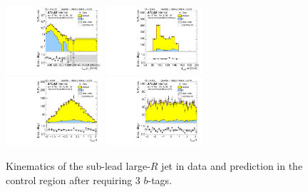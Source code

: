 \begin{figure}[htbp!]
\begin{center}
\includegraphics[width=0.32\textwidth,angle=-90]{figures/boosted/Control/b77_ThreeTag_Control_sublHCand_Pt_m_1.pdf}
\includegraphics[width=0.32\textwidth,angle=-90]{figures/boosted/Control/b77_ThreeTag_Control_sublHCand_Mass_s.pdf}\\
\includegraphics[width=0.32\textwidth,angle=-90]{figures/boosted/Control/b77_ThreeTag_Control_sublHCand_Eta.pdf}
\includegraphics[width=0.32\textwidth,angle=-90]{figures/boosted/Control/b77_ThreeTag_Control_sublHCand_Phi.pdf}
  \caption{Kinematics of the sub-lead large-$R$ jet in data and prediction in the control region after requiring 3 $b$-tags. }
  \label{fig:boosted-3b-control-ak10-subl}
\end{center}
\end{figure}

